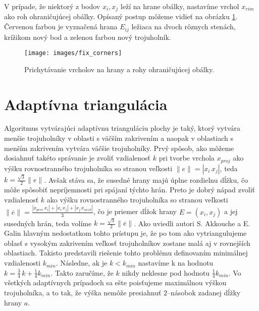 V prípade, že niektorý z bodov $x_i, x_j$ leží na hrane obálky, nastavíme vrchol
$x_{rim}$ ako roh ohraničujúcej obálky.
Opísaný postup môžeme vidieť na obrázku \ref{obr:fix_corners}. Červenou farbou je vyznačená 
hrana $E_{ij}$ ležiaca na dvoch rôznych stenách, krížikom nový bod a zelenou
farbou nový trojuholník.

\begin{figure}
    \centerline{\texttt{[image: images/fix\_corners]}}
    \caption[Prichytávanie vrcholov na hrany a rohy ohraničujúcej obálky]
    {Prichytávanie vrcholov na hrany a rohy ohraničujúcej obálky.}
    \label{obr:fix_corners}
\end{figure}

\section{Adaptívna triangulácia}

Algoritmus vytvárajúci adaptívnu trianguláciu plochy je taký, ktorý vytvára menšie trojuholníky v oblasti 
s väčším zakrivením a naopak v oblastiach s menším zakrivením vytvára väčšie trojuholníky.
Prvý spôsob, ako môžeme dosiahnuť takéto správanie je zvoliť vzdialenosť $k$ pri tvorbe vrchola $x_{proj}$
ako výšku rovnostranného trojuholníka so stranou veľkosti $\|e\| = | x_i \, x_j |$, teda 
$k=\frac{\sqrt 3}{2} \| e \|$. Avšak stáva sa, že susedné
hrany majú úplne rozdielnu dĺžku, čo môže spôsobiť nepríjemnosti pri spájaní týchto hrán. 
Preto je dobrý nápad zvoliť vzdialenosť $k$ ako výšku rovnostranného trojuholníka so stranou veľkosti
$\| \overline{e} \| = \frac{| x_{prev} \, x_i | + | x_i \, x_j | + | x_j \, x_{next} |}{3}$, čo je 
priemer dĺžok hrany
$E = (x_i, x_j)$ a jej susedných hrán, teda volíme $k=\frac{\sqrt 3}{2} \| \overline{e} \|$. 
Ako uviedli autori S. Akkouche a E. Galin \cite{akkouche2001adaptive}
hlavným nedostatkom tohto prístupu je, že po tom ako vytriangulujeme oblasť s vysokým zakrivením 
veľkosť trojuholníkov zostane malá aj v rovnejších oblastiach. Takisto predstavili riešenie tohto 
problému definovaním minimálnej vzdialenosti $k_{min}$. Následne, ak je $k < k_{min}$ 
nastavíme k na hodnotu $k = \frac{3}{4} \, k + \frac{1}{4} k_{min}$. Takto zaručíme, že $k$ nikdy neklesne
pod hodnotu $\frac{1}{4} k_{min}$. 
Vo všetkých adaptívnych prípadoch sa ešte poisťujeme maximálnou výškou trojuholníka, a to tak, že
výška nemôže presiahnuť $2$--násobok zadanej dĺžky hrany $a$.

